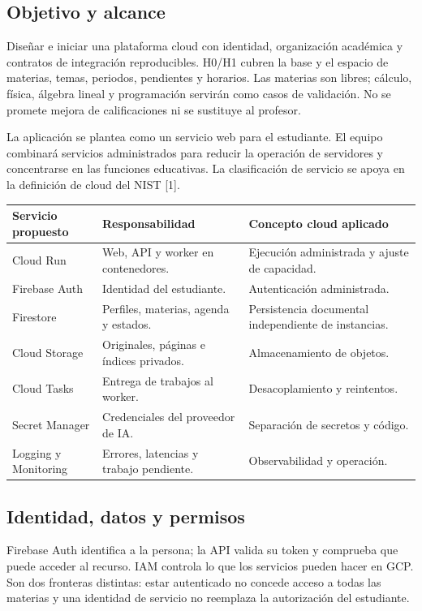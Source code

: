 \subsection*{Objetivo y alcance}
Diseñar e iniciar una plataforma cloud con identidad, organización académica y contratos de integración reproducibles. H0/H1 cubren la base y el espacio de materias, temas, periodos, pendientes y horarios. Las materias son libres; cálculo, física, álgebra lineal y programación servirán como casos de validación. No se promete mejora de calificaciones ni se sustituye al profesor.

La aplicación se plantea como un servicio web para el estudiante. El equipo combinará servicios administrados para reducir la operación de servidores y concentrarse en las funciones educativas. La clasificación de servicio se apoya en la definición de cloud del NIST [1].

\begin{tabularx}{\linewidth}{P{3cm}Y Y}
\toprule
\textbf{Servicio propuesto} & \textbf{Responsabilidad} & \textbf{Concepto cloud aplicado}\\
\midrule
Cloud Run & Web, API y worker en contenedores. & Ejecución administrada y ajuste de capacidad.\\
Firebase Auth & Identidad del estudiante. & Autenticación administrada.\\
Firestore & Perfiles, materias, agenda y estados. & Persistencia documental independiente de instancias.\\
Cloud Storage & Originales, páginas e índices privados. & Almacenamiento de objetos.\\
Cloud Tasks & Entrega de trabajos al worker. & Desacoplamiento y reintentos.\\
Secret Manager & Credenciales del proveedor de IA. & Separación de secretos y código.\\
Logging y Monitoring & Errores, latencias y trabajo pendiente. & Observabilidad y operación.\\
\bottomrule
\end{tabularx}

\subsection*{Identidad, datos y permisos}
Firebase Auth identifica a la persona; la API valida su token y comprueba que puede acceder al recurso. IAM controla lo que los servicios pueden hacer en GCP. Son dos fronteras distintas: estar autenticado no concede acceso a todas las materias y una identidad de servicio no reemplaza la autorización del estudiante.

